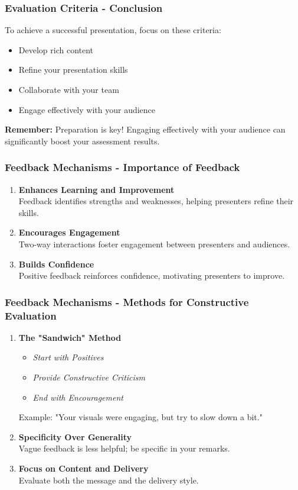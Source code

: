\documentclass[aspectratio=169]{beamer}
\begin{document}
\begin{frame}[fragile]
    \frametitle{Evaluation Criteria - Conclusion}
    To achieve a successful presentation, focus on these criteria:
    \begin{itemize}
        \item Develop rich content 
        \item Refine your presentation skills 
        \item Collaborate with your team 
        \item Engage effectively with your audience
    \end{itemize}
    \textbf{Remember:} Preparation is key! Engaging effectively with your audience can significantly boost your assessment results.
\end{frame}

\begin{frame}[fragile]
    \frametitle{Feedback Mechanisms - Importance of Feedback}
    \begin{enumerate}
        \item \textbf{Enhances Learning and Improvement} \\
            Feedback identifies strengths and weaknesses, helping presenters refine their skills.
        \item \textbf{Encourages Engagement} \\
            Two-way interactions foster engagement between presenters and audiences.
        \item \textbf{Builds Confidence} \\
            Positive feedback reinforces confidence, motivating presenters to improve.
    \end{enumerate}
\end{frame}

\begin{frame}[fragile]
    \frametitle{Feedback Mechanisms - Methods for Constructive Evaluation}
    \begin{enumerate}
        \item \textbf{The "Sandwich" Method} \\
            \begin{itemize}
                \item \textit{Start with Positives}
                \item \textit{Provide Constructive Criticism}
                \item \textit{End with Encouragement}
            \end{itemize}
            Example: "Your visuals were engaging, but try to slow down a bit."
        
        \item \textbf{Specificity Over Generality} \\
            Vague feedback is less helpful; be specific in your remarks.
        
        \item \textbf{Focus on Content and Delivery} \\
            Evaluate both the message and the delivery style.
    \end{enumerate}
\end{frame}
\end{document}

